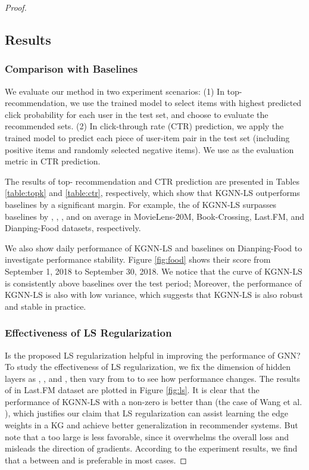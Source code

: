 \documentclass[sigconf]{acmart}
\begin{document}
\begin{proof}
	\subsection{Results}
		\subsubsection{Comparison with Baselines}			We evaluate our method in two experiment scenarios:
			(1) In top- recommendation, we use the trained model to select  items with highest predicted click probability for each user in the test set, and choose  to evaluate the recommended sets.
			(2) In click-through rate (CTR) prediction, we apply the trained model to predict each piece of user-item pair in the test set (including positive items and randomly selected negative items).
			We use  as the evaluation metric in CTR prediction.
			
			The results of top- recommendation and CTR prediction are presented in Tables \ref{table:topk} and \ref{table:ctr}, respectively, which show that KGNN-LS outperforms baselines by a significant margin.
			For example, the  of KGNN-LS surpasses baselines by , , , and  on average in MovieLens-20M, Book-Crossing, Last.FM, and Dianping-Food datasets, respectively.
        				
			We also show daily performance of KGNN-LS and baselines on Dianping-Food to investigate performance stability.
			Figure \ref{fig:food} shows their  score from September 1, 2018 to September 30, 2018.
			We notice that the curve of KGNN-LS is consistently above baselines over the test period;
			Moreover, the performance of KGNN-LS is also with low variance, which suggests that KGNN-LS is also robust and stable in practice.
			
			
		\subsubsection{Effectiveness of LS Regularization}
			Is the proposed LS regularization helpful in improving the performance of GNN?
			To study the effectiveness of LS regularization, we fix the dimension of hidden layers as , , and , then vary  from  to  to see how performance changes.
			The results of  in Last.FM dataset are plotted in Figure \ref{fig:ls}.
			It is clear that the performance of KGNN-LS with a non-zero  is better than  (the case of Wang et al. \cite{wang2019knowledge}), which justifies our claim that LS regularization can assist learning the edge weights in a KG and achieve better generalization in recommender systems.
			But note that a too large  is less favorable, since it overwhelms the overall loss and misleads the direction of gradients.
			According to the experiment results, we find that a  between  and  is preferable in most cases.
			

\end{proof}
\end{document}

